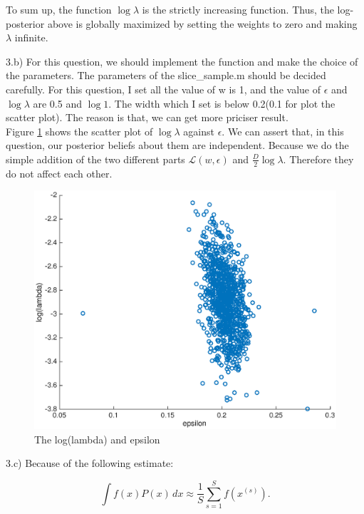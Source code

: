 \documentclass{article}
\begin{document}
To sum up, the function $\log \lambda$ is the strictly increasing function. Thus, the log-posterior above is globally maximized by setting the weights
to zero and making $\lambda$ infinite.

3.b) For this question, we should implement the function and make the choice of the parameters. 
The parameters of the slice\_sample.m should be decided carefully. For this question, I set all the value of w is 1, and the value of $\epsilon$ and $\log \lambda$ 
are 0.5 and $\log 1$. The width which I set is below 0.2(0.1 for plot the scatter plot). The reason is that, we can get more priciser result.\\
Figure \ref{fig:23b} shows the scatter plot of $\log \lambda$ against $\epsilon$. We can assert that, in this question, our 
posterior beliefs about them are independent. Because we do the simple addition of the two different parts $\mathcal{L}(w,\epsilon)$ and $\frac{D}{2}\log \lambda$.
Therefore they do not affect each other.


\begin{figure}[H]
    \centering
    \includegraphics[keepaspectratio=true,width=\linewidth]{./pic/23b.eps}
    \caption{The log(lambda) and epsilon}
    \label{fig:23b}
\end{figure}





3.c) Because of the following estimate:

\begin{center}
    \[ \int f(x)P(x) \,d x \approx \frac{1}{S}\sum\limits_{s=1}^{S}f(x^{(s)}).\] 
\end{center}
\end{document}
